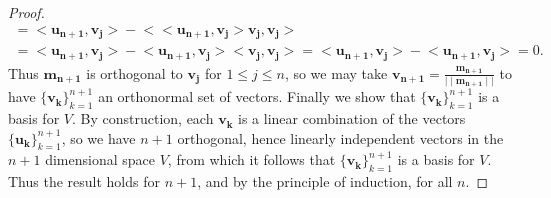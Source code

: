 \documentclass[12pt]{article}
\theoremstyle{plain}
\begin{document}
\begin{proof}
\begin{multline*}
=\big<\mathbf{u_{n+1}},\mathbf{v_j}\big>
-\biggl<\big<\mathbf{u_{n+1}},\mathbf{v_j}\big>\mathbf{v_j},\mathbf{v_j}\biggr>\\
=\big<\mathbf{u_{n+1}},\mathbf{v_j}\big>
-\big<\mathbf{u_{n+1}},\mathbf{v_{j}}\big>\big<\mathbf{v_j},\mathbf{v_j}\big>
=\big<\mathbf{u_{n+1}},\mathbf{v_{j}}\big>
-\big<\mathbf{u_{n+1}},\mathbf{v_{j}}\big>
=0\text{.}
\end{multline*}
Thus $\mathbf{m_{n+1}}$ is orthogonal to $\mathbf{v_j}$ for $1\leq j\leq n$, so we may take $\mathbf{v_{n+1}}=\tfrac{\mathbf{m_{n+1}}}{\mid\mid\mathbf{m_{n+1}}\mid\mid}$ to have $\{\mathbf{v_k}\}_{k=1}^{n+1}$ an orthonormal set of vectors. Finally we show that $\{\mathbf{v_k}\}_{k=1}^{n+1}$ is a basis for $V$. 
By construction, each $\mathbf{v_k}$ is a linear combination of the vectors $\{\mathbf{u_k}\}_{k=1}^{n+1}$, so we have $n+1$ orthogonal, hence linearly independent vectors in the $n+1$ dimensional space $V$, from which it follows that $\{\mathbf{v_k}\}_{k=1}^{n+1}$ is a basis for $V$. Thus the result holds for $n+1$, and by the principle of induction, for all $n$. 
\end{proof}
\end{document}
